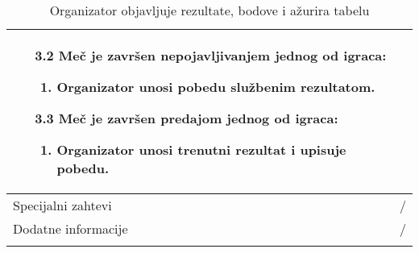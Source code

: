 \documentclass{article}
\begin{document}
\begin{longtable}{| p{} | p{} |}
\begin{enumerate}
        \item [3.2] Meč je završen nepojavljivanjem jednog od igraca: \begin{enumerate}
            \item Organizator unosi pobedu službenim rezultatom.
        \end{enumerate}
        \item [3.3] Meč je završen predajom jednog od igraca: \begin{enumerate}
            \item Organizator unosi trenutni rezultat i upisuje pobedu.
        \end{enumerate}
    \end{enumerate}\\
\hline
    Specijalni zahtevi & /\\
\hline
    Dodatne informacije & / \\
\hline

\caption{Organizator objavljuje rezultate, bodove i ažurira tabelu} 
\end{longtable}
\end{document}

